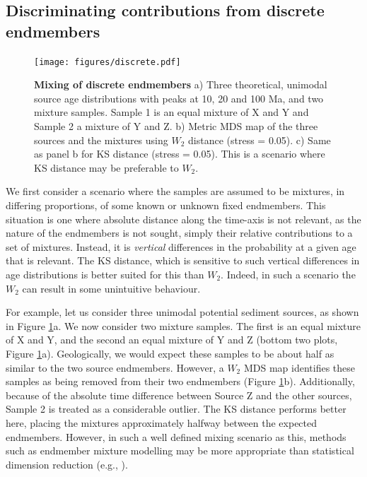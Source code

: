 \documentclass[gchron, manuscript]{copernicus}
\begin{document}
\subsection{Discriminating contributions from discrete endmembers}

\begin{figure}
    \centering
    \texttt{[image: figures/discrete.pdf]}
    \caption{\textbf{Mixing of discrete endmembers} a) Three theoretical, unimodal source age distributions with peaks at 10, 20 and 100 Ma, and two mixture samples. Sample 1 is an equal mixture of X and Y and Sample 2 a mixture of Y and Z. b) Metric MDS map of the three sources and the mixtures using $W_2$ distance (stress = 0.05). c) Same as panel b for KS distance (stress = 0.05). This is a scenario where KS distance may be preferable to $W_2$.}
    \label{fig:discrete}
\end{figure}

We first consider a scenario where the samples are assumed to be mixtures, in differing proportions, of some known or unknown fixed endmembers. This situation is one where absolute distance along the time-axis is not relevant, as the nature of the endmembers is not sought, simply their relative contributions to a set of mixtures. Instead, it is \textit{vertical} differences in the probability at a given age that is relevant. The KS distance, which is sensitive to such vertical differences in age distributions is better suited for this than $W_2$. Indeed, in such a scenario the $W_2$ can result in some unintuitive behaviour. 

For example, let us consider three unimodal potential sediment sources, as shown in Figure \ref{fig:discrete}a. We now consider two mixture samples. The first is an equal mixture of X and Y, and the second an equal mixture of Y and Z (bottom two plots, Figure \ref{fig:discrete}a). Geologically, we would expect these samples to be about half as similar to the two source endmembers. However, a $W_2$ MDS map identifies these samples as being removed from their two endmembers (Figure \ref{fig:discrete}b). Additionally, because of the absolute time difference between Source Z and the other sources, Sample 2 is treated as a considerable outlier. The KS distance performs better here, placing the mixtures approximately halfway between the expected endmembers. However, in such a well defined mixing scenario as this, methods such as endmember mixture modelling may be more appropriate than statistical dimension reduction (e.g., \citealt{weltje_end-member_1997,sharman_sediment_2017,dietze_grain-size_2019}).
\end{document}
